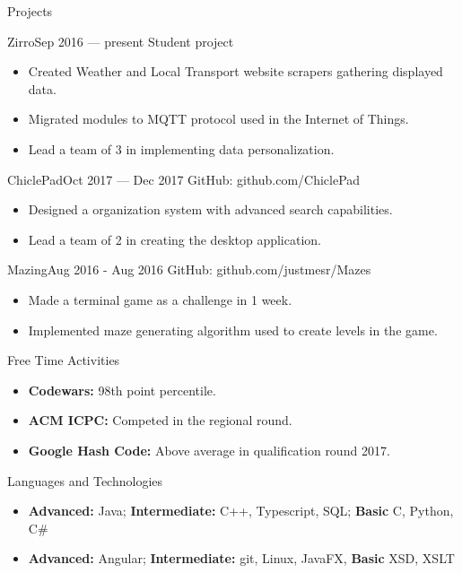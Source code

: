 \documentclass[]{style}
\begin{document}
	\begin{cvsection}{Projects}
		\begin{cvsubsection}{Zirro}{}{Sep 2016 — present}
			Student project
			\begin{itemize}
				\item Created Weather and Local Transport website scrapers gathering displayed data.
				\item Migrated modules to MQTT protocol used in the Internet of Things.
				\item Lead a team of 3 in implementing data personalization.
			\end{itemize}
		\end{cvsubsection}

		\begin{cvsubsection}{ChiclePad}{}{Oct 2017 — Dec 2017}
			GitHub: github.com/ChiclePad
			\begin{itemize}
				\item Designed a organization system with advanced search capabilities.
				\item Lead a team of 2 in creating the desktop application.
			\end{itemize}
		\end{cvsubsection}

		\begin{cvsubsection}{Mazing}{}{Aug 2016 - Aug 2016}
			GitHub: github.com/justmesr/Mazes
			\begin{itemize}
				\item Made a terminal game as a challenge in 1 week.
				\item Implemented maze generating algorithm used to create levels in the game. 
			\end{itemize}
		\end{cvsubsection}
	\end{cvsection}
	
	\begin{cvsection}{Free Time Activities}
		\begin{cvsubsection}{}{}{}	
			\begin{itemize}
				\item \textbf{Codewars:} 98th point percentile.
                \item \textbf{ACM ICPC:} Competed in the regional round.
                \item \textbf{Google Hash Code:} Above average in qualification round 2017.
			\end{itemize}
		\end{cvsubsection}
	\end{cvsection}
	
	\begin{cvsection}{Languages and Technologies}
		\begin{cvsubsection}{}{}{}	
			\begin{itemize}
				\item \textbf{Advanced:} Java; \textbf{Intermediate:} C++, Typescript, SQL; \textbf{Basic} C, Python, C\# 
				\item \textbf{Advanced:} Angular; \textbf{Intermediate:} git, Linux, JavaFX, \textbf{Basic} XSD, XSLT
			\end{itemize}
		\end{cvsubsection}
	\end{cvsection}
	
\end{document}
